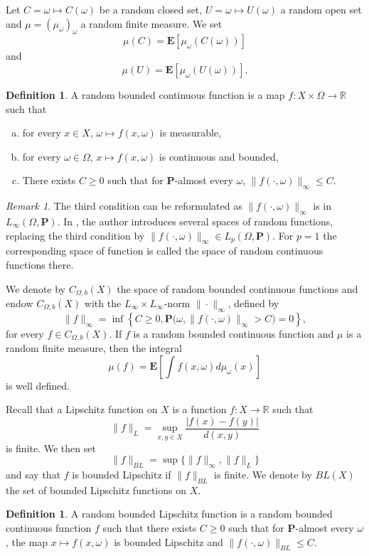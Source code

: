 \documentclass{amsart}
\theoremstyle{definition}
\newtheorem{defn}[thm]{Definition}
\theoremstyle{remark}
\newtheorem{rem}[thm]{Remark}
\begin{document}
Let $C=\omega\mapsto C(\omega)$ be a random closed set, $U=\omega\mapsto U(\omega)$ a random open set and $\mu=(\mu_\omega)_\omega$ a random finite measure.
We set
$$\mu(C)=\mathbf E\left [\mu_\omega(C(\omega))\right]$$
and
$$\mu(U)=\mathbf E\left [\mu_\omega(U(\omega))\right].$$

\begin{defn}\label{defrandomcontinuousfunction}
A random bounded continuous function is a map
$f:X\times \Omega\to \mathbb R$ such that
\begin{enumerate}[(a)]
    \item for every $x\in X$, $\omega\mapsto f(x,\omega)$ is measurable,
    \item for every $\omega\in \Omega$, $x\mapsto f(x,\omega)$ is continuous and bounded,
    \item There exists $C\geq 0$ such that for $\mathbf P$-almost every $\omega$, $\|f(\cdot,\omega)\|_\infty\leq C$.
\end{enumerate}
\end{defn}

\begin{rem}
The third condition can be reformulated as $\|f(\cdot,\omega)\|_\infty$ is in $L_\infty(\Omega,\mathbf P)$.
In \cite{Crauel}, the author introduces several spaces of random functions, replacing the third condition by $\|f(\cdot,\omega)\|_\infty\in L_p(\Omega,\mathbf P)$.
For $p=1$ the corresponding space of function is called the space of random continuous functions there.
\end{rem}

We denote by $C_{\Omega,b}(X)$ the space of random bounded continuous functions and endow $C_{\Omega,b}(X)$ with the $L_\infty\times L_\infty$-norm $\|\cdot\|_\infty$,
defined by
$$\|f\|_\infty=\inf \left\{C\geq 0, \mathbf P\big (\omega,\|f(\cdot,\omega)\|_\infty>C\big)=0\right\},$$
for every $f\in C_{\Omega,b}(X)$.
If $f$ is a random bounded continuous function and $\mu$ is a random finite measure, then the integral
$$\mu(f)=\mathbf E\left [\int f(x,\omega)d\mu_\omega(x)\right]$$
is well defined.

Recall that a Lipschitz function on $X$ is a function $f:X\to \mathbb R$ such that
$$\|f\|_L=\sup_{x,y\in X}\frac{|f(x)-f(y)|}{d(x,y)}$$
is finite.
We then set
$$\|f\|_{BL}=\sup \{\|f\|_\infty,\|f\|_L\}$$
and say that $f$ is bounded Lipschitz if $\|f\|_{BL}$ is finite.
We denote by $BL(X)$ the set of bounded Lipschitz functions on $X$.

\begin{defn}\label{defrandomlipschitzfunction}
A random bounded Lipschitz function is a random bounded continuous function $f$ such that there exists $C\geq0$ such that for $\mathbf P$-almost every $\omega$, the map 
$x\mapsto f(x,\omega)$ is bounded Lipschitz and $\|f(\cdot,\omega)\|_{BL}\leq C$.
\end{defn}
\end{document}
